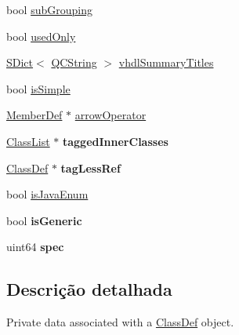 \begin{DoxyCompactItemize}
\item 
bool \hyperlink{class_class_def_impl_a6c0b6dfd8da3027f83dfdbfeffce7706}{sub\-Grouping}
\item 
bool \hyperlink{class_class_def_impl_a6220c6b3d9e0fc97dbb0c56d446d37d5}{used\-Only}
\item 
\hyperlink{class_s_dict}{S\-Dict}$<$ \hyperlink{class_q_c_string}{Q\-C\-String} $>$ \hyperlink{class_class_def_impl_a70b6b23084b915bdfc841b0139d4e331}{vhdl\-Summary\-Titles}
\item 
bool \hyperlink{class_class_def_impl_af8faf5b670c25ccc13f661f3ab94d1e0}{is\-Simple}
\item 
\hyperlink{class_member_def}{Member\-Def} $\ast$ \hyperlink{class_class_def_impl_afb944a90be4237de66127e07bf39d20a}{arrow\-Operator}
\item 
\hypertarget{class_class_def_impl_a1a65fc055a96d942f15c01b42e28797b}{\hyperlink{class_class_list}{Class\-List} $\ast$ {\bfseries tagged\-Inner\-Classes}}\label{class_class_def_impl_a1a65fc055a96d942f15c01b42e28797b}

\item 
\hypertarget{class_class_def_impl_a50c4f38a125049347e84bf9dd6823ed5}{\hyperlink{class_class_def}{Class\-Def} $\ast$ {\bfseries tag\-Less\-Ref}}\label{class_class_def_impl_a50c4f38a125049347e84bf9dd6823ed5}

\item 
bool \hyperlink{class_class_def_impl_a4b9507fb8aad93504c5ef971dc9d25c3}{is\-Java\-Enum}
\item 
\hypertarget{class_class_def_impl_ad8353edb1d69060bc8a7fe42f13fba12}{bool {\bfseries is\-Generic}}\label{class_class_def_impl_ad8353edb1d69060bc8a7fe42f13fba12}

\item 
\hypertarget{class_class_def_impl_ab185cff582e0684a926b4da23bca207d}{uint64 {\bfseries spec}}\label{class_class_def_impl_ab185cff582e0684a926b4da23bca207d}

\end{DoxyCompactItemize}


\subsection{Descrição detalhada}
Private data associated with a \hyperlink{class_class_def}{Class\-Def} object. 

